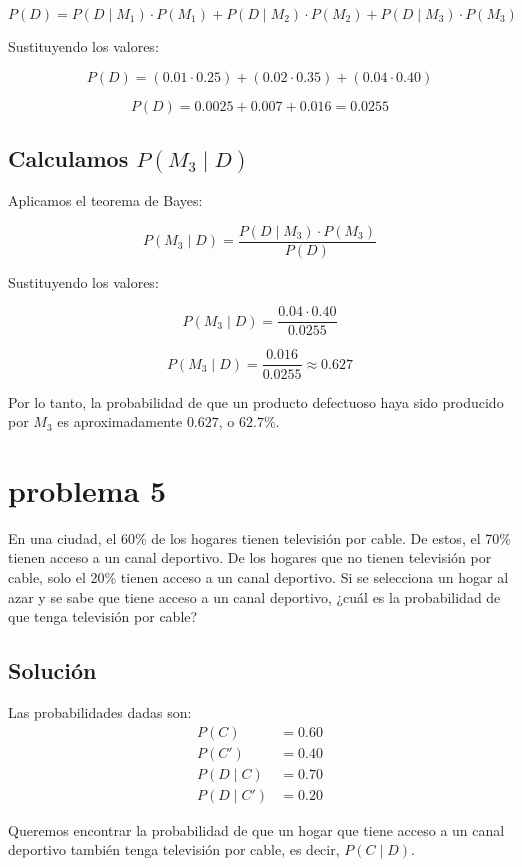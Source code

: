 \documentclass[12pt,a4paper]{article}
\begin{document}
\[
P(D) = P(D \mid M_1) \cdot P(M_1) + P(D \mid M_2) \cdot P(M_2) + P(D \mid M_3) \cdot P(M_3)
\]

Sustituyendo los valores:

\[
P(D) = (0.01 \cdot 0.25) + (0.02 \cdot 0.35) + (0.04 \cdot 0.40)
\]

\[
P(D) = 0.0025 + 0.007 + 0.016 = 0.0255
\]

\subsection*{Calculamos \( P(M_3 \mid D) \)}

Aplicamos el teorema de Bayes:

\[
P(M_3 \mid D) = \frac{P(D \mid M_3) \cdot P(M_3)}{P(D)}
\]

Sustituyendo los valores:

\[
P(M_3 \mid D) = \frac{0.04 \cdot 0.40}{0.0255}
\]

\[
P(M_3 \mid D) = \frac{0.016}{0.0255} \approx 0.627
\]

Por lo tanto, la probabilidad de que un producto defectuoso haya sido producido por \( M_3 \) es aproximadamente \( 0.627 \), o \( 62.7\% \).

\section*{problema 5}
En una ciudad, el 60\% de los hogares tienen televisión por cable. De estos, el 70\% tienen acceso a un canal deportivo. De los hogares que no tienen televisión por cable, solo el 20\% tienen acceso a un canal deportivo. Si se selecciona un hogar al azar y se sabe que tiene acceso a un canal deportivo, ¿cuál es la probabilidad de que tenga televisión por cable?

\subsection*{Solución}


Las probabilidades dadas son:
\begin{align*}
P(C) &= 0.60 \\
P(C') &= 0.40 \\
P(D \mid C) &= 0.70 \\
P(D \mid C') &= 0.20
\end{align*}

Queremos encontrar la probabilidad de que un hogar que tiene acceso a un canal deportivo también tenga televisión por cable, es decir, \( P(C \mid D) \).
\end{document}
